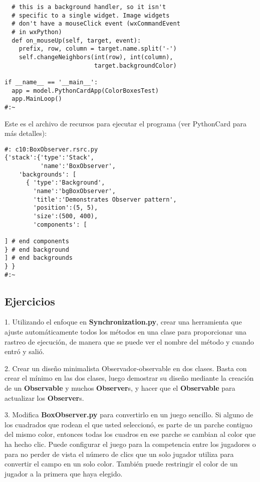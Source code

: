 \begin{lstlisting}
  # this is a background handler, so it isn't   
  # specific to a single widget. Image widgets  
  # don't have a mouseClick event (wxCommandEvent 
  # in wxPython) 
  def on_mouseUp(self, target, event): 
    prefix, row, column = target.name.split('-') 
    self.changeNeighbors(int(row), int(column),  
                         target.backgroundColor) 
                         
if __name__ == '__main__': 
  app = model.PythonCardApp(ColorBoxesTest) 
  app.MainLoop() 
#:~ 
\end{lstlisting}

Este es el archivo de recursos para ejecutar el programa (ver PythonCard para más detalles):  \newline

\begin{lstlisting} 
#: c10:BoxObserver.rsrc.py 
{'stack':{'type':'Stack', 
          'name':'BoxObserver', 
    'backgrounds': [ 
      { 'type':'Background', 
        'name':'bgBoxObserver', 
        'title':'Demonstrates Observer pattern', 
        'position':(5, 5), 
        'size':(500, 400), 
        'components': [ 
        
] # end components 
} # end background 
] # end backgrounds 
} } 
#:~ 
\end{lstlisting}


\subsection*{Ejercicios}
\label{subsec:Ejercicios12}


1. Utilizando el enfoque en  \textbf{Synchronization.py}, crear una herramienta que ajuste automáticamente todos los métodos en una clase para proporcionar una rastreo de ejecución, de manera que se puede ver el nombre del método y cuando entró y salió. \newline

2. Crear un diseño minimalista Observador-observable en dos clases. Basta con crear el mínimo en las dos clases, luego demostrar su diseño mediante la creación de un \textbf{Observable} y muchos \textbf{Observer}s, y hacer que el \textbf{Observable} para actualizar los \textbf{Observer}s.   \newline

3. Modifica \textbf{BoxObserver.py} para convertirlo en un juego sencillo. Si alguno de los cuadrados que rodean el que usted seleccionó, es parte de un parche contiguo del mismo color, entonces todas los cuadros en ese parche se cambian al color que ha hecho clic. Puede configurar el juego para la competencia entre los jugadores o para no perder de vista el número de clics que un solo jugador utiliza para convertir el campo en un solo color. También puede restringir el color de un jugador a la primera que haya elegido. \newline